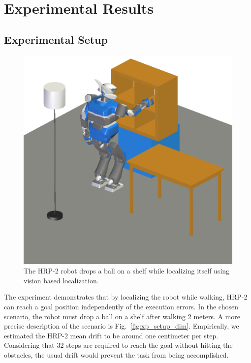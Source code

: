 \section{Experimental Results}\label{sec:results}

\subsection{Experimental Setup}\label{sec:xp_setup}


\begin{figure}[ht!] %
  \begin{center}
    \includegraphics[width=\linewidth]{images/trajectory-8.png}
  \end{center}
  \caption{The HRP-2 robot drops a ball on a shelf while localizing
    itself using vision based localization. \label{fig:xp_setup_screenshot}}
\end{figure}


The experiment demonstrates that by localizing the robot while
walking, HRP-2 can reach a goal position independently of the
execution errors. In the chosen scenario, the robot must drop a ball
on a shelf after walking 2 meters. A more precise description of the
scenario is Fig.~\ref{fig:xp_setup_dim}. Empirically, we estimated the
HRP-2 mean drift to be around one centimeter per step. Considering
that 32 steps are required to reach the goal without hitting the
obstacles, the usual drift would prevent the task from being
accomplished.

